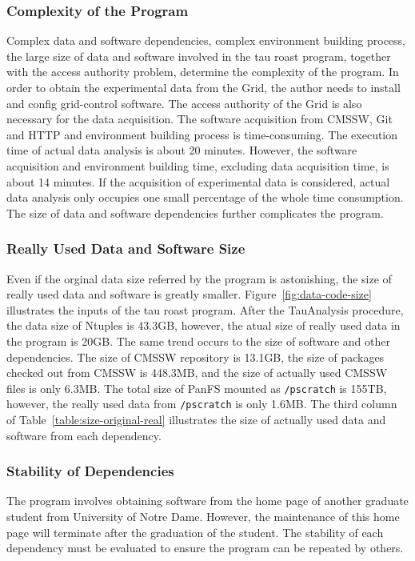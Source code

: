 \documentclass{acm_proc_article-sp}
\begin{document}
\subsubsection{Complexity of the Program}
Complex data and software dependencies, complex environment building process, the large size of data and software involved in the tau roast program, together with the access authority problem, determine the complexity of the program. 
In order to obtain the experimental data from the Grid, the author needs to install and config grid-control software. 
The access authority of the Grid is also necessary for the data acquisition.
The software acquisition from CMSSW, Git and HTTP and environment building process is time-consuming. The execution time of actual data analysis is about 20 minutes. However, the software acquisition and environment building time, excluding data acquisition time, is about 14 minutes. If the acquisition of experimental data is considered, actual data analysis only occupies one small percentage of the whole time consumption.
The size of data and software dependencies further complicates the program.

\subsubsection{Really Used Data and Software Size} 

Even if the orginal data size referred by the program is astonishing, the size
of really used data and software is greatly smaller.
Figure~\ref{fig:data-code-size} illustrates the inputs of the tau roast program.
After the TauAnalysis procedure, the data size of Ntuples is 43.3GB, however, the atual size of really used
data in the program is 20GB.  The same trend occurs to the size of software and
other dependencies. The size of CMSSW repository is 13.1GB, the size of
packages checked out from CMSSW is 448.3MB, and the size of actually used CMSSW
files is only 6.3MB. 
The total size of PanFS mounted as {\tt /pscratch} is 155TB, however, the really used data from {\tt /pscratch} is only 1.6MB.
The third column of Table~\ref{table:size-original-real} illustrates the size of actually used data and software from each dependency.

\subsubsection{Stability of Dependencies}

The program involves obtaining software from the home page of another graduate
student from University of Notre Dame. However, the maintenance of this
home page will terminate after the graduation of the student.
The stability of each dependency must be evaluated to ensure the program can be 
repeated by others.
\end{document}
